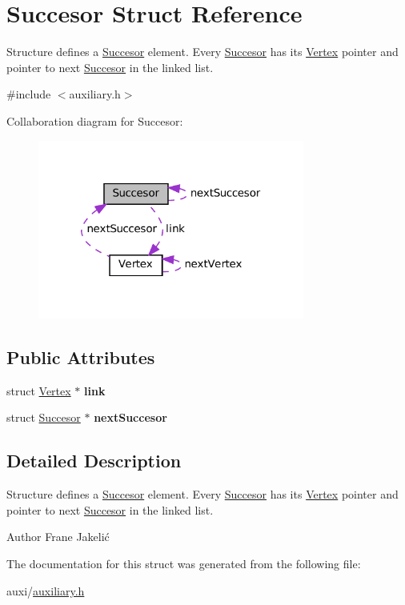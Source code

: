\hypertarget{structSuccesor}{}\section{Succesor Struct Reference}
\label{structSuccesor}


Structure defines a \hyperlink{structSuccesor}{Succesor} element. Every \hyperlink{structSuccesor}{Succesor} has its \hyperlink{structVertex}{Vertex} pointer and pointer to next \hyperlink{structSuccesor}{Succesor} in the linked list.  




{\ttfamily \#include $<$auxiliary.\+h$>$}



Collaboration diagram for Succesor\+:\nopagebreak
\begin{figure}[H]
\begin{center}
\leavevmode
\includegraphics[width=248pt]{structSuccesor__coll__graph}
\end{center}
\end{figure}
\subsection*{Public Attributes}
\begin{DoxyCompactItemize}
\item 
\mbox{\label{structSuccesor_affebe250c404c7426916e52c915cbfe8}} 
struct \hyperlink{structVertex}{Vertex} $\ast$ {\bfseries link}
\item 
\mbox{\label{structSuccesor_ad0495c04475861725352992d924a5d96}} 
struct \hyperlink{structSuccesor}{Succesor} $\ast$ {\bfseries next\+Succesor}
\end{DoxyCompactItemize}


\subsection{Detailed Description}
Structure defines a \hyperlink{structSuccesor}{Succesor} element. Every \hyperlink{structSuccesor}{Succesor} has its \hyperlink{structVertex}{Vertex} pointer and pointer to next \hyperlink{structSuccesor}{Succesor} in the linked list. 

\begin{DoxyAuthor}{Author}
Frane Jakelić 
\end{DoxyAuthor}


The documentation for this struct was generated from the following file\+:\begin{DoxyCompactItemize}
\item 
auxi/\hyperlink{auxiliary_8h}{auxiliary.\+h}\end{DoxyCompactItemize}

